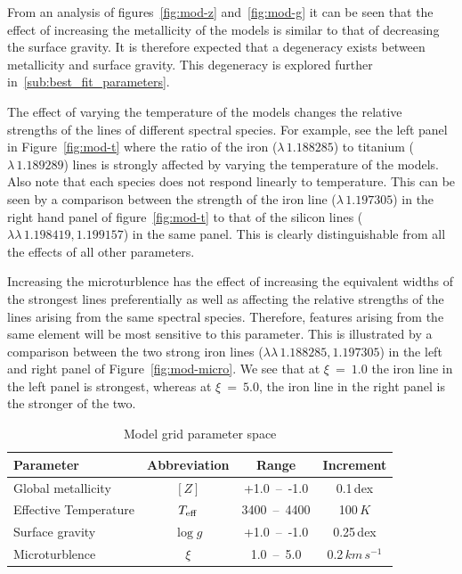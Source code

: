 From an analysis of figures~\ref{fig:mod-z} and~\ref{fig:mod-g} it can be seen that the effect of increasing the metallicity of the models is similar to that of decreasing the surface gravity.
It is therefore expected that a degeneracy exists between metallicity and surface gravity.
This degeneracy is explored further in~\ref{sub:best_fit_parameters}.

The effect of varying the temperature of the models changes the relative strengths of the lines of different spectral species.
For example, see the left panel in Figure~\ref{fig:mod-t} where the ratio of the iron
($\lambda\,1.188285$) to titanium ($\lambda\,1.189289$) lines is strongly affected by varying the temperature of the models.
Also note that each species does not respond linearly to temperature.
This can be seen by a comparison between the strength of the iron line
($\lambda\,1.197305$) in the right hand panel of figure~\ref{fig:mod-t} to that of the silicon lines
($\lambda\lambda\,1.198419, 1.199157$) in the same panel.
This is clearly distinguishable from all the effects of all other parameters.


Increasing the microturblence has the effect of increasing the equivalent widths
of the strongest lines preferentially as well as affecting the relative strengths of the lines arising from the same spectral species.
Therefore, features arising from the same element will be most sensitive to this
parameter.
This is illustrated by a comparison between the two strong iron lines
($\lambda\lambda\,1.188285, 1.197305$) in the left and
right panel of Figure~\ref{fig:mod-micro}.
We see that at $\xi~=~1.0$ the iron line in the left panel is strongest,
whereas at $\xi~=~5.0$, the iron line in the right panel is the stronger of the two.


\begin{table}
\caption{Model grid parameter space\label{tb:grid}}
\scriptsize
\begin{center}
\begin{tabular}{lccc}
 \hline
 \hline
Parameter & Abbreviation & Range & Increment \\
 \hline
Global metallicity & $[Z]$ & +1.0~--~-1.0 & 0.1\,dex \\
Effective Temperature & $T_{\rm eff}$ & 3400~--~4400 & 100\,$K$ \\
Surface gravity & $\log g$ & +1.0~--~-1.0 & 0.25\,dex \\
Microturblence & $\xi$ & 1.0~--~5.0 & 0.2\,$km\,s^{-1}$ \\
 \hline
\end{tabular}
\end{center}
\end{table}


